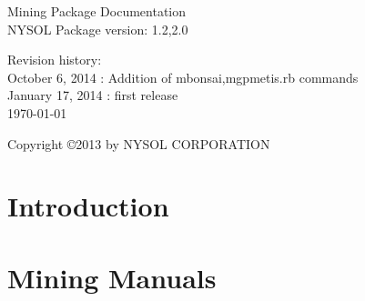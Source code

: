 \documentclass[a4paper]{book}
\begin{document}
\begin{titlepage}
\begin{center}
{\huge Mining Package Documentation}\\
\vspace{10truept}
{\normalsize NYSOL Package version: 1.2,2.0}\\
\vspace{1cm}

Revision history:\\
October 6, 2014 : Addition of mbonsai,mgpmetis.rb commands\\
January 17, 2014 : first release\\
\vspace{18cm}
{\small \today}

{\small Copyright \copyright 2013 by NYSOL CORPORATION}
\end{center}
\end{titlepage}

\setcounter{tocdepth}{1}
\tableofcontents




\chapter{Introduction}



\chapter{Mining Manuals}






%
%

\end{document}
